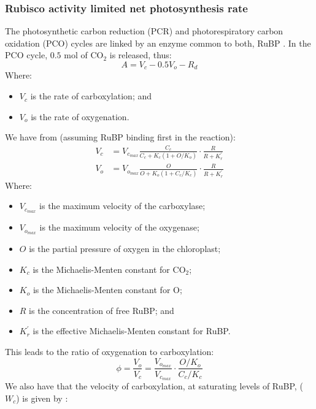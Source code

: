 \documentclass[11pt]{article} %
\begin{document}
\subsubsection{Rubisco activity limited net photosynthesis rate}
The photosynthetic carbon reduction (PCR) and photorespiratory carbon oxidation (PCO) cycles are linked by an enzyme common to both, RuBP \cite{Farquharbiochemicalmodelphotosynthetic1980}. In the PCO cycle, $0.5$ mol of CO$_2$ is released, thus:
\begin{equation} \label{net_assimilation_raw}
A = V_c - 0.5 V_o - R_d
\end{equation}
Where:
\begin{itemize}
 \item $V_c$ is the rate of carboxylation; and
 \item $V_o$ is the rate of oxygenation.
\end{itemize}
We have from \citet{FarquharModelsdescribingkinetics1979} (assuming RuBP binding first in the reaction):
\begin{align} \label{V_c}
V_c &= V_{c_{max}}\frac{C_c}{C_c+K_c\left(1 + O/K_o\right)}\cdot\frac{R}{R + K^\prime_r} \\
V_o &= V_{o_{max}}\frac{O}{O+K_o\left(1 + C_c/K_c\right)}\cdot\frac{R}{R + K^\prime_r}
\end{align}
Where:
\begin{itemize}
 \item $V_{c_{max}}$ is the maximum velocity of the carboxylase;
 \item $V_{o_{max}}$ is the maximum velocity of the oxygenase;
 \item $O$ is the partial pressure of oxygen in the chloroplast;
 \item $K_c$ is the Michaelis-Menten constant for CO$_2$;
 \item $K_o$ is the Michaelis-Menten constant for O;
 \item $R$ is the concentration of free RuBP; and
 \item $K^\prime_r$ is the effective Michaelis-Menten constant for RuBP.
\end{itemize}
This leads to the ratio of oxygenation to carboxylation:
\begin{equation} \label{ratio_oxygenation_carboxylation}
\phi = \frac{V_o}{V_c} = \frac{V_{o_{max}}}{V_{c_{max}}}\cdot\frac{O/K_o}{C_c/K_c}
\end{equation}
We also have that the velocity of carboxylation, at saturating levels of RuBP, ($W_c$) is given by \cite{GrantTestsimplebiochemical1989}:
\end{document}
